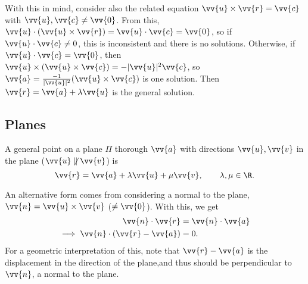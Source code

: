With this in mind, consider also the related equation $\vv{u} \times \vv{r} = \vv{c}$ with $\vv{u}, \vv{c} \neq \vv{0}$. From this, $\vv{u} \cdot (\vv{u} \times \vv{r}) = \vv{u} \cdot \vv{c} = \vv{0}$, so if $\vv{u} \cdot \vv{c} \neq 0$, this is inconsistent and there is no solutions. Otherwise, if $\vv{u} \cdot \vv{c}= \vv{0}$, then $\vv{u} \times (\vv{u} \times \vv{c}) = -|\vv{u}|^2 \vv{c}$, so $\vv{a} = \frac{-1}{|\vv{u}|^2}(\vv{u} \times \vv{c})$ is one solution. Then $\vv{r} = \vv{a} + \lambda \vv{u}$ is the general solution.


\subsection{Planes}

A general point on a plane $\Pi$ thorough $\vv{a}$ with directions $\vv{u}, \vv{v}$ in the plane ($\vv{u} \not \parallel \vv{v}$) is
$$
\vv{r} = \vv{a} + \lambda \vv{u} + \mu \vv{v}, \quad \quad \lambda, \mu \in \R.
$$

\begin{center}
\end{center}

An alternative form comes from considering a normal to the plane, $\vv{n}= \vv{u} \times \vv{v}$ ($\neq \vv{0}$). With this, we get
\begin{align*}
    \vv{n} \cdot \vv{r} &= \vv{n} \cdot \vv{a}  \\
\implies   \vv{n} \cdot (\vv{r} - \vv{a}) &= 0.
\end{align*}
For a geometric interpretation of this, note that $\vv{r} - \vv{a}$ is the displacement in the direction of the plane,and thus should be perpendicular to $\vv{n}$, a normal to the plane.

